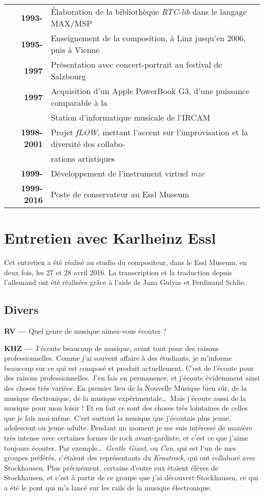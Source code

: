 \documentclass[a4paper,12pt]{article}
\newcommand{\maze}[0]{\emph{m\symbol{64}ze\textdegree2}}
\begin{document}
\begin{tabular}{rl}
\textbf{1993-} & Élaboration de la bibliothèque \emph{RTC-lib} dans le langage MAX/MSP \\
\textbf{1995-} & Enseignement de la composition, à Linz jusqu'en 2006, puis à Vienne \\
\textbf{1997} & Présentation avec concert-portrait au festival de Salzbourg \\
\textbf{1997} & Acquisition d'un Apple PowerBook G3, d'une puissance comparable à la \\ & Station d'informatique musicale de l'IRCAM \\
\textbf{1998-2001} & Projet \emph{fLOW}, mettant l'accent sur l'improvisation et la diversité des collabo- \\ & rations artistiques \\
\textbf{1999-} & Développement de l'instrument virtuel \maze \\
\textbf{1999-2016} & Poste de conservateur au Essl Museum
\end{tabular}

\newpage
\section{Entretien avec Karlheinz Essl}

Cet entretien a été réalisé au studio du compositeur, dans le Essl Museum, en deux fois, les 27 et 28 avril 2016. La transcription et la traduction depuis l'allemand ont été réalisées grâce à l'aide de Jana Gulyas et Ferdinand Schlie.

\subsection{Divers}

\textbf{RV ---} Quel genre de musique aimez-vous écouter ?

\textbf{KHZ ---} J'écoute beaucoup de musique, avant tout pour des raisons professionnelles. Comme j'ai souvent affaire à des étudiants, je m'informe beaucoup sur ce qui est composé et produit actuellement. C'est de l'écoute pour des raisons professionnelles. J'en fais en permanence, et j'écoute évidemment ainsi des choses très variées. En premier lieu de la Nouvelle Musique bien sûr, de la musique électronique, de la musique expérimentale\dots~Mais j'écoute aussi de la musique pour mon loisir ! Et en fait ce sont des choses très lointaines de celles que je fais moi-même. C'est surtout la musique que j'écoutais plus jeune, adolescent ou jeune adulte. Pendant un moment je me suis intéressé de manière très intense avec certaines formes de rock avant-gardiste, et c'est ce que j'aime toujours écouter. Par exemple\dots~\emph{Gentle Giant}, ou \emph{Can}, qui est l'un de mes groupes préférés, c'étaient des représentants du \emph{Krautrock}, qui ont collaboré avec Stockhausen. Plus précisément, certains d'entre eux étaient élèves de Stockhausen, et c'est à partir de ce groupe que j'ai découvert Stockhausen, ce qui a été le pont qui m'a lancé sur les rails de la musique électronique.
\end{document}
